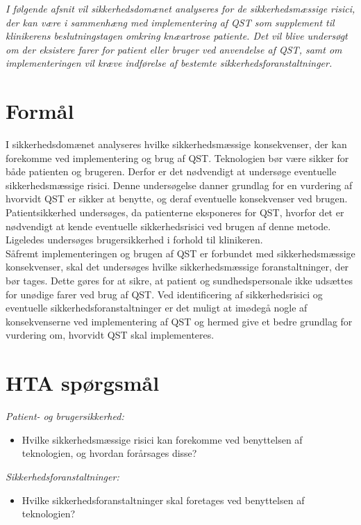 \textit{I følgende afsnit vil sikkerhedsdomænet analyseres for de sikkerhedsmæssige risici, der kan være i sammenhæng med implementering af QST som supplement til klinikerens beslutningstagen omkring knæartrose patiente. Det vil blive undersøgt om der eksistere farer for patient eller bruger ved anvendelse af QST, samt om implementeringen vil kræve indførelse af bestemte sikkerhedsforanstaltninger.}

\section{Formål} \label{SAF_chap}
I sikkerhedsdomænet analyseres hvilke sikkerhedsmæssige konsekvenser, der kan forekomme ved implementering og brug af QST. Teknologien bør være sikker for både patienten og brugeren. Derfor er det nødvendigt at undersøge eventuelle sikkerhedsmæssige risici. Denne undersøgelse danner grundlag for en vurdering af hvorvidt QST er sikker at benytte, og deraf eventuelle konsekvenser ved brugen. \\
Patientsikkerhed undersøges, da patienterne eksponeres for QST, hvorfor det er nødvendigt at kende eventuelle sikkerhedsrisici ved brugen af denne metode. Ligeledes undersøges brugersikkerhed i forhold til klinikeren. \\
Såfremt implementeringen og brugen af QST er forbundet med sikkerhedsmæssige konsekvenser, skal det undersøges hvilke sikkerhedsmæssige foranstaltninger, der bør tages. Dette gøres for at sikre, at patient og sundhedspersonale ikke udsættes for unødige farer ved brug af QST. Ved identificering af sikkerhedsrisici og eventuelle sikkerhedsforanstaltninger er det muligt at imødegå nogle af konsekvenserne ved implementering af QST og hermed give et bedre grundlag for vurdering om, hvorvidt QST skal implementeres.
\section{HTA spørgsmål}
\textit{Patient- og brugersikkerhed:}
\begin{itemize}
\item Hvilke sikkerhedsmæssige risici kan forekomme ved benyttelsen af teknologien, og hvordan forårsages disse? %
\end{itemize}
\textit{Sikkerhedsforanstaltninger:}
\begin{itemize}
\item Hvilke sikkerhedsforanstaltninger skal foretages ved benyttelsen af teknologien?  %
\end{itemize}

